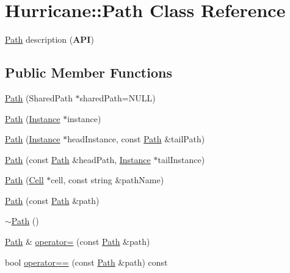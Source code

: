 \hypertarget{classHurricane_1_1Path}{\section{Hurricane\-:\-:Path Class Reference}
\label{classHurricane_1_1Path}
}


\hyperlink{classHurricane_1_1Path}{Path} description ({\bfseries A\-P\-I})  


\subsection*{Public Member Functions}
\begin{DoxyCompactItemize}
\item 
\hyperlink{classHurricane_1_1Path_ad3fe735dcb2ce630f89b98c039663c23}{Path} (Shared\-Path $\ast$shared\-Path=N\-U\-L\-L)
\item 
\hyperlink{classHurricane_1_1Path_aa1a70f922b9b6a78fd3ac9b7bd94d158}{Path} (\hyperlink{classHurricane_1_1Instance}{Instance} $\ast$instance)
\item 
\hyperlink{classHurricane_1_1Path_a3197a114ed98117dde0f41d999917775}{Path} (\hyperlink{classHurricane_1_1Instance}{Instance} $\ast$head\-Instance, const \hyperlink{classHurricane_1_1Path}{Path} \&tail\-Path)
\item 
\hyperlink{classHurricane_1_1Path_add5812ab3bb9a4cf6dbe49d1e4e932cb}{Path} (const \hyperlink{classHurricane_1_1Path}{Path} \&head\-Path, \hyperlink{classHurricane_1_1Instance}{Instance} $\ast$tail\-Instance)
\item 
\hyperlink{classHurricane_1_1Path_a6e3d331f5c5a0dcb91d10516a4beb6bc}{Path} (\hyperlink{classHurricane_1_1Cell}{Cell} $\ast$cell, const string \&path\-Name)
\item 
\hyperlink{classHurricane_1_1Path_a8db875f788013ec5ad8ed517cf1e1715}{Path} (const \hyperlink{classHurricane_1_1Path}{Path} \&path)
\item 
\hyperlink{classHurricane_1_1Path_a6226639f50213598ffad86031afe69ff}{$\sim$\-Path} ()
\item 
\hyperlink{classHurricane_1_1Path}{Path} \& \hyperlink{classHurricane_1_1Path_a1355dd2d191d492a1b5e5180324a9f8f}{operator=} (const \hyperlink{classHurricane_1_1Path}{Path} \&path)
\item 
bool \hyperlink{classHurricane_1_1Path_a656eab3e5f88c9a2201c718eff883dc9}{operator==} (const \hyperlink{classHurricane_1_1Path}{Path} \&path) const 
\item 

\end{DoxyCompactItemize}
